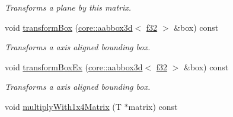 \begin{DoxyCompactItemize}
\begin{DoxyCompactList}\small\item\em Transforms a plane by this matrix. \end{DoxyCompactList}\item 
void \hyperlink{classirr_1_1core_1_1CMatrix4_ac12468d698fbf6cd545e8b3fbf2a0042}{transform\+Box} (\hyperlink{classirr_1_1core_1_1aabbox3d}{core\+::aabbox3d}$<$ \hyperlink{namespaceirr_a0277be98d67dc26ff93b1a6a1d086b07}{f32} $>$ \&box) const 
\begin{DoxyCompactList}\small\item\em Transforms a axis aligned bounding box. \end{DoxyCompactList}\item 
void \hyperlink{classirr_1_1core_1_1CMatrix4_a87451aea9c07b71d1a8b6091b8cefa63}{transform\+Box\+Ex} (\hyperlink{classirr_1_1core_1_1aabbox3d}{core\+::aabbox3d}$<$ \hyperlink{namespaceirr_a0277be98d67dc26ff93b1a6a1d086b07}{f32} $>$ \&box) const 
\begin{DoxyCompactList}\small\item\em Transforms a axis aligned bounding box. \end{DoxyCompactList}\item 
void \hyperlink{classirr_1_1core_1_1CMatrix4_a1e1f04cdf57dc76be2875427498a0d62}{multiply\+With1x4\+Matrix} (T $\ast$matrix) const \hypertarget{classirr_1_1core_1_1CMatrix4_a1e1f04cdf57dc76be2875427498a0d62}{}\label{classirr_1_1core_1_1CMatrix4_a1e1f04cdf57dc76be2875427498a0d62}


\end{DoxyCompactItemize}
